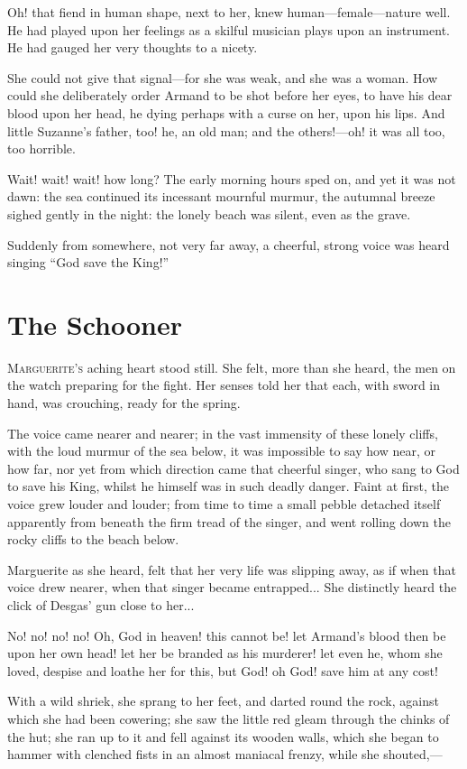 \documentclass[paper=5.5in:8.5in,BCOR=7mm,twoside,DIV=calc,12pt,usegeometry,chapterprefix,endperiod,headings=big]{scrbook}
\begin{document}
Oh! that fiend in human shape, next to her, knew human---female---nature well. He had played upon her feelings as a skilful musician plays upon an instrument. He had gauged her very thoughts to a nicety.

She could not give that signal---for she was weak, and she was a woman. How could she deliberately order Armand to be shot before her eyes, to have his dear blood upon her head, he dying perhaps with a curse on her, upon his lips. And little Suzanne's father, too! he, an old man; and the others!---oh! it was all too, too horrible.

Wait! wait! wait! how long? The early morning hours sped on, and yet it was not dawn: the sea continued its incessant mournful murmur, the autumnal breeze sighed gently in the night: the lonely beach was silent, even as the grave.

Suddenly from somewhere, not very far away, a cheerful, strong voice was heard singing \enquote{God save the King!}

\chapter{The Schooner}
\lettrine[lines=4]{M}{arguerite's} aching heart stood still. She felt, more than she heard, the men on the watch preparing for the fight. Her senses told her that each, with sword in hand, was crouching, ready for the spring.

The voice came nearer and nearer; in the vast immensity of these lonely cliffs, with the loud murmur of the sea below, it was impossible to say how near, or how far, nor yet from which direction came that cheerful singer, who sang to God to save his King, whilst he himself was in such deadly danger. Faint at first, the voice grew louder and louder; from time to time a small pebble detached itself apparently from beneath the firm tread of the singer, and went rolling down the rocky cliffs to the beach below.

Marguerite as she heard, felt that her very life was slipping away, as if when that voice drew nearer, when that singer became entrapped... She distinctly heard the click of Desgas’ gun close to her...

No! no! no! no! Oh, God in heaven! this cannot be! let Armand's blood then be upon her own head! let her be branded as his murderer! let even he, whom she loved, despise and loathe her for this, but God! oh God! save him at any cost!

With a wild shriek, she sprang to her feet, and darted round the rock, against which she had been cowering; she saw the little red gleam through the chinks of the hut; she ran up to it and fell against its wooden walls, which she began to hammer with clenched fists in an almost maniacal frenzy, while she shouted,---
\end{document}
